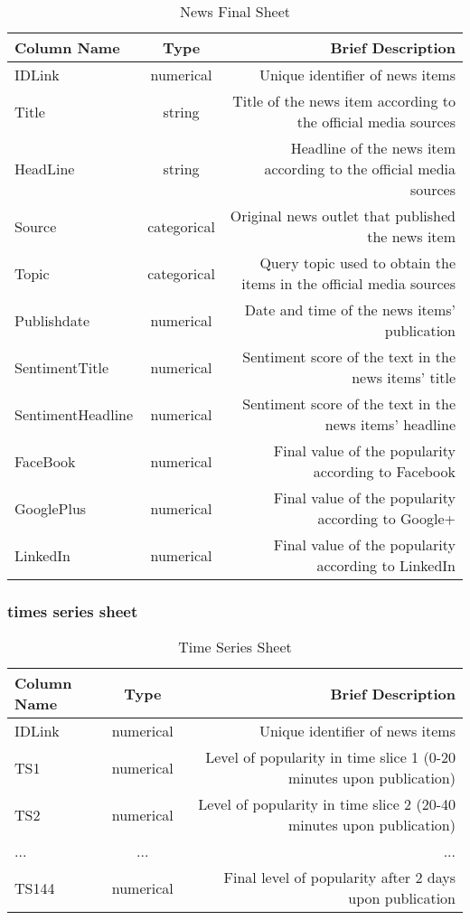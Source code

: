 \documentclass[10pt]{article}
\begin{document}
\begin{table}[h!]
    \begin{center}
      \caption{News Final Sheet}
      \label{tab:table1}
      \begin{tabular}{l|c|r} 
        \textbf{Column Name} & \textbf{Type} & \textbf{Brief Description}\\
        \hline
        IDLink & numerical & Unique identifier of news items\\
        Title & string & Title of the news item according to the official media sources\\
        HeadLine & string & Headline of the news item according to the official media sources\\
        Source & categorical & Original news outlet that published the news item\\
        Topic & categorical & Query topic used to obtain the items in the official media sources\\
        Publishdate & numerical & Date and time of the news items' publication\\
        SentimentTitle & numerical & Sentiment score of the text in the news items' title\\
        SentimentHeadline & numerical & Sentiment score of the text in the news items' headline\\
        FaceBook & numerical & Final value of the popularity according to Facebook\\
        GooglePlus & numerical & Final value of the popularity according to Google+\\
        LinkedIn & numerical & Final value of the popularity according to LinkedIn\\
    \end{tabular}
  \end{center}
\end{table}


\subsubsection{times series sheet}
\begin{table}[h!]
    \begin{center}
      \caption{Time Series Sheet}
      \label{tab:table2}
      \begin{tabular}{l|c|r} 
        \textbf{Column Name} & \textbf{Type} & \textbf{Brief Description}\\
        \hline
        IDLink & numerical & Unique identifier of news items\\
        TS1 & numerical & Level of popularity in time slice 1 (0-20 minutes upon publication)\\
        TS2 & numerical & Level of popularity in time slice 2 (20-40 minutes upon publication)\\
        ... & ... & ...\\
        TS144 & numerical & Final level of popularity after 2 days upon publication\\
      \end{tabular}
    \end{center}
  \end{table}
\end{document}
